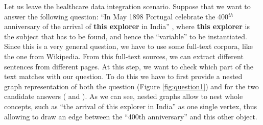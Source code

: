 \begin{example}\label{ex:nestalign}
Let us leave the healthcare data integration scenario. Suppose that we want to answer the following question: ``In May 1898 Portugal celebrate the 400$^{th}$ anniversary of the arrival of \textbf{this explorer} in India'' \cite{IBMWatson}, where \textbf{this explorer} is the subject that has to be found, and hence the ``variable'' to be instantiated. Since this is a very general question, we have to use some full-text corpora, like the one from Wikipedia. From this full-text sources, we can extract different sentences from different pages. At this step, we want to check which part of the text matches with our question. To do this we have to first provide a nested graph representation of both the question (Figure \vref{fig:question1}) and for the two candidate answers ( and ). As we can see, nested graphs allow to nest whole concepts, such as ``the arrival of this explorer in India''  as one single vertex, thus allowing to draw an edge between the ``400th anniversary'' and this other object.
	

\end{example}

